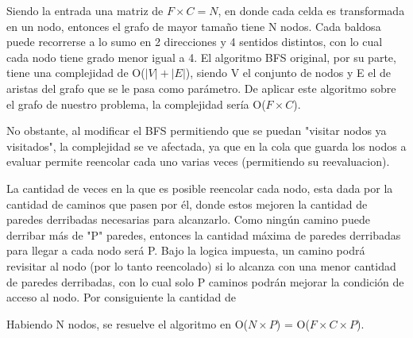 Siendo la entrada una matriz de $F \times C = N$, en donde cada celda es transformada en un nodo, entonces el grafo de mayor tamaño tiene N nodos. Cada baldosa puede recorrerse a lo sumo en 2 direcciones y 4 sentidos distintos, con lo cual cada nodo tiene grado menor igual a 4. El algoritmo BFS original, por su parte, tiene una complejidad de O($|V|+|E|$), siendo V el conjunto de nodos y E el de aristas del grafo que se le pasa como parámetro. De aplicar este algoritmo sobre el grafo de nuestro problema, la complejidad sería O($F \times C$).

No obstante, al modificar el BFS permitiendo que se puedan "visitar nodos ya visitados", la complejidad se ve afectada, ya que en la cola que guarda los nodos a evaluar permite reencolar cada uno varias veces (permitiendo su reevaluacion).

La cantidad de veces en la que es posible reencolar cada nodo, esta dada por la cantidad de caminos que pasen por él, donde estos mejoren la cantidad de paredes derribadas necesarias para alcanzarlo. Como ningún camino puede derribar más de "P" paredes, entonces la cantidad máxima de paredes derribadas para llegar a cada nodo será P. Bajo la logica impuesta, un camino podrá revisitar al nodo (por lo tanto reencolado) si lo alcanza con una menor cantidad de paredes derribadas, con lo cual solo P caminos podrán mejorar la condición de acceso al nodo. Por consiguiente la cantidad de 













 Habiendo N nodos, se resuelve el algoritmo en O($N \times P$) = O($F \times C \times P$).